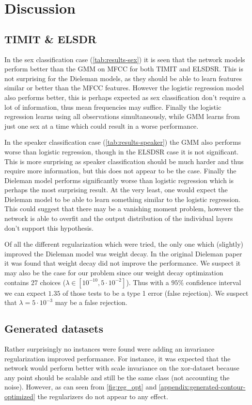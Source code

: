 \section{Discussion}
\subsection{TIMIT \& ELSDR}
In the sex classification case (\cref{tab:results-sex}) it is seen that the network models perform better than the GMM on MFCC for both TIMIT and ELSDSR. This is not surprising for the Dieleman models, as they should be able to learn features similar or better than the MFCC features. However the logistic regression model also performs better, this is perhaps expected as sex classification don't require a lot of information, thus mean frequencies may suffice. Finally the logistic regression learns using all observations simultaneously, while GMM learns from just one sex at a time which could result in a worse performance.

In the speaker classification case (\cref{tab:results-speaker}) the GMM also performs worse than logistic regression, though in the ELSDSR case it is not significant. This is more surprising as speaker classification should be much harder and thus require more information, but this does not appear to be the case. Finally the Dieleman model performs significantly worse than logistic regression which is perhaps the most surprising result. At the very least, one would expect the Dieleman model to be able to learn something similar to the logistic regression. This could suggest that there may be a vanishing moment problem, however the network is able to overfit and the output distribution of the individual layers don't support this hypothesis.

Of all the different regularization which were tried, the only one which (slightly) improved the Dieleman model was weight decay. In the original Dieleman paper \cite{dieleman} it was found that weight decay did not improve the performance. We suspect it may also be the case for our problem since our weight decay optimization contains 27 choices ($\lambda \in [10^{-10}, 5 \cdot 10^{-2}]$). Thus with a $95\%$ confidence interval we can expect $1.35$ of those tests to be a type 1 error (false rejection). We suspect that $\lambda = 5 \cdot 10^{-3}$ may be a false rejection.

\subsection{Generated datasets}
Rather surprisingly no instances were found were adding an invariance regularization improved performance. For instance, it was expected that the network would perform better with scale invariance on the xor-dataset because any point should be scalable and still be the same class (not accounting the noise). However, as can seen from \cref{fig:reg_opt} and \cref{appendix:generated-contour-optimized} the regularizers do not appear to any effect. 

